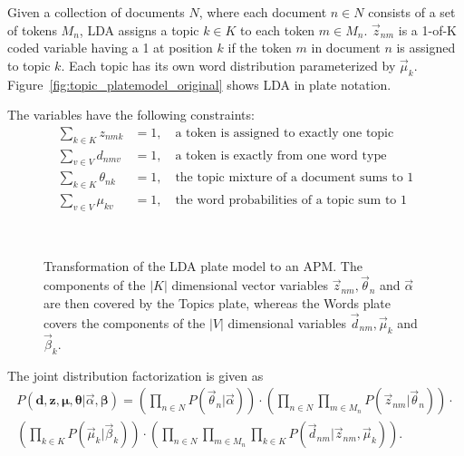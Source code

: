 Given a collection of documents $N$, where each document $n \in N$ consists of a set of tokens $M_n$, LDA assigns a topic $k \in K$ to each token $m \in M_n$. $\vec z_{nm}$ is a 1-of-K coded variable having a 1 at position $k$ if the token $m$ in document $n$ is assigned to topic $k$. Each topic has its own word distribution parameterized by $\vec \mu_k$. Figure~\ref{fig:topic_platemodel_original} shows LDA in plate notation.

The variables have the following constraints:
\begin{align}
\sum_{k \in K} z_{nmk} &= 1,\quad \text{a token is assigned to exactly one topic}\\
\sum_{v \in V} d_{nmv} &= 1,\quad \text{a token is exactly from one word type}\\
\sum_{k \in K} \theta_{nk} &= 1,\quad \text{the topic mixture of a document sums to 1}\\
\sum_{v \in V} \mu_{kv} &= 1,\quad \text{the word probabilities of a topic sum to 1}
\end{align}

\begin{figure}[t]
\begin{minipage}[t]{0.49\linewidth}
	\begin{center}
	\end{center}
\end{minipage}
\hspace{0.0cm}
\begin{minipage}[t]{0.49\linewidth}
	\begin{center}
	\end{center}
\end{minipage}\\
\caption[Transformation of LDA plate model to an APM]{Transformation of the LDA plate model to an APM. The components of the $|K|$ dimensional vector variables $\vec z_{nm}, \vec \theta_n$ and $\vec \alpha$ are then covered by the Topics plate, whereas the Words plate covers the components of the $|V|$ dimensional variables $\vec d_{nm}, \vec \mu_k$ and $\vec \beta_k$.}
\label{img:topic_platemodels}
\end{figure}

The joint distribution factorization is given as
\begin{multline}
P(\boldsymbol{d},\boldsymbol{z}, \boldsymbol{\mu}, \boldsymbol{\theta} | \vec \alpha, \boldsymbol{\beta}) =
 \left(\prod_{n \in N} P(\vec \theta_n | \vec \alpha)\right) \cdot
 \left(\prod_{n \in N} \prod_{m \in M_n} P(\vec z_{nm} | \vec \theta_n)\right) \cdot \\
 \left(\prod_{k \in K} P(\vec \mu_k | \vec \beta_k)\right) \cdot
 \left(\prod_{n \in N} \prod_{m \in M_n} \prod_{k \in K}P(\vec d_{nm} | \vec z_{nm}, \vec \mu_k)\right).
\end{multline}

